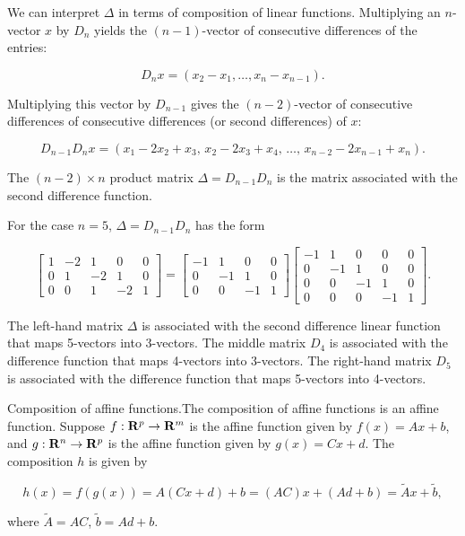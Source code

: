 We can interpret \(\Delta\) in terms of composition of linear functions. Multiplying an \(n\)-vector \(x\) by \(D_{n}\) yields the \((n-1)\)-vector of consecutive differences of the entries:

\[D_{n}x=(x_{2}-x_{1},\ldots,x_{n}-x_{n-1}).\]

Multiplying this vector by \(D_{n-1}\) gives the \((n-2)\)-vector of consecutive differences of consecutive differences (or second differences) of \(x\):

\[D_{n-1}D_{n}x=(x_{1}-2x_{2}+x_{3},\,x_{2}-2x_{3}+x_{4},\,\ldots,\,x_{n-2}-2x_{ n-1}+x_{n}).\]

The \((n-2)\times n\) product matrix \(\Delta=D_{n-1}D_{n}\) is the matrix associated with the second difference function.

For the case \(n=5\), \(\Delta=D_{n-1}D_{n}\) has the form

\[\left[\begin{array}{ccccc}1&-2&1&0&0\\ 0&1&-2&1&0\\ 0&0&1&-2&1\end{array}\right]=\left[\begin{array}{ccccc}-1&1&0&0\\ 0&-1&1&0\\ 0&0&-1&1\end{array}\right]\left[\begin{array}{ccccc}-1&1&0&0&0\\ 0&-1&1&0&0\\ 0&0&-1&1&0\\ 0&0&0&-1&1\end{array}\right].\]

The left-hand matrix \(\Delta\) is associated with the second difference linear function that maps 5-vectors into 3-vectors. The middle matrix \(D_{4}\) is associated with the difference function that maps 4-vectors into 3-vectors. The right-hand matrix \(D_{5}\) is associated with the difference function that maps 5-vectors into 4-vectors.

Composition of affine functions.The composition of affine functions is an affine function. Suppose \(f:{\bf R}^{p}\to{\bf R}^{m}\) is the affine function given by \(f(x)=Ax+b\), and \(g:{\bf R}^{n}\to{\bf R}^{p}\) is the affine function given by \(g(x)=Cx+d\). The composition \(h\) is given by

\[h(x)=f(g(x))=A(Cx+d)+b=(AC)x+(Ad+b)=\tilde{A}x+\tilde{b},\]

where \(\tilde{A}=AC\), \(\tilde{b}=Ad+b\).

